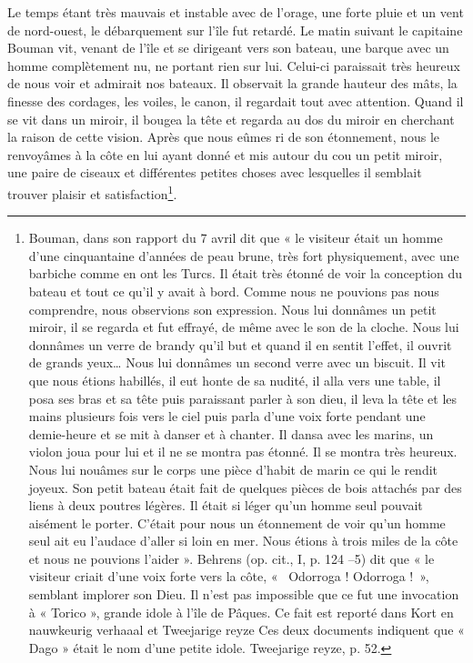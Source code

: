 \documentclass{article}
\begin{document}
        
    Le temps étant très mauvais et instable avec de l'orage, une forte pluie et un vent de nord-ouest, le débarquement sur l'île fut retardé. Le matin suivant le capitaine Bouman vit, venant de l'île et se dirigeant vers son bateau, une barque avec un homme complètement nu, ne portant rien sur lui. Celui-ci paraissait très heureux de nous voir et admirait nos bateaux. Il observait la grande hauteur des mâts, la finesse des cordages, les voiles, le canon, il regardait tout avec attention. Quand il se vit dans un miroir, il bougea la tête et regarda au dos du miroir en cherchant la raison de cette vision. Après que nous eûmes ri de son étonnement, nous le renvoyâmes à la côte en lui ayant donné et mis autour du cou un petit miroir, une paire de ciseaux et différentes petites choses avec lesquelles il semblait trouver plaisir et satisfaction\footnote{Bouman, dans son rapport du 7 avril dit que « le visiteur était un homme d'une cinquantaine d'années de peau brune, très fort physiquement, avec une barbiche comme en ont les Turcs. Il était très étonné de voir la conception du bateau et tout ce qu'il y avait à bord. Comme nous ne pouvions pas nous comprendre, nous observions son expression. Nous lui donnâmes un petit miroir, il se regarda et fut effrayé, de même avec le son de la cloche. Nous lui donnâmes un verre de brandy qu'il but et quand il en sentit l'effet, il ouvrit de grands yeux… Nous lui donnâmes un second verre avec un biscuit. Il vit que nous étions habillés, il eut honte de sa nudité, il alla vers une table, il posa ses bras et sa tête puis paraissant parler à son dieu, il leva la tête et les mains plusieurs fois vers le ciel puis parla d'une voix forte pendant une demie-heure et se mit à danser et à chanter. Il dansa avec les marins, un violon joua pour lui et il ne se montra pas étonné. Il se montra très heureux. Nous lui nouâmes sur le corps une pièce d'habit de marin ce qui le rendit joyeux. Son petit bateau était fait de quelques pièces de bois attachés par des liens à deux poutres légères. Il était si léger qu'un homme seul pouvait aisément le porter. C'était pour nous un étonnement de voir qu'un homme seul ait eu l'audace d'aller si loin en mer. Nous étions à trois miles de la côte et nous ne pouvions l'aider ». Behrens (op. cit., I, p. 124 –5) dit que « le visiteur criait d'une voix forte vers la côte, «  Odorroga ! Odorroga ! », semblant implorer son Dieu. Il n'est pas impossible que ce fut une invocation à « Torico », grande idole à l'île de Pâques. Ce fait est reporté dans Kort en nauwkeurig verhaaal et Tweejarige reyze Ces deux documents indiquent que « Dago » était le nom d'une petite idole. Tweejarige reyze, p. 52.}.
            
\end{document}
